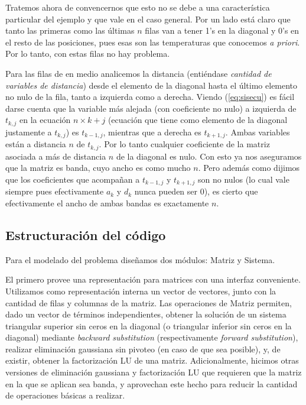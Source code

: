 Tratemos ahora de convencernos que esto no se debe a una característica particular del ejemplo y que vale en el caso general.
Por un lado está claro que tanto las primeras como las últimas $n$ filas van a tener 1's en la diagonal y 0's en el resto de las posiciones, pues esas son las temperaturas que conocemos \textit{a priori}. Por lo tanto, con estas filas no hay problema.

Para las filas de en medio analicemos la distancia (entiéndase \textit{cantidad de variables de distancia}) desde el elemento de la diagonal hasta el último elemento no nulo de la fila, tanto a izquierda como  a derecha. Viendo (\ref{eq:sisecu}) es fácil darse cuenta que la variable más alejada (con coeficiente no nulo) a izquierda de $t_{k,j}$ en la ecuación $n\times k + j$ (ecuación que tiene como elemento de la diagonal justamente a $t_{k,j}$) es $t_{k-1, j}$, mientras que a derecha es $t_{k+1, j}$. Ambas variables están a distancia $n$ de $t_{k,j}$. Por lo tanto cualquier coeficiente de la matriz asociada a más de distancia $n$ de la diagonal es nulo. Con esto ya nos aseguramos que la matriz es banda, cuyo ancho es como mucho $n$. Pero además como dijimos que los coeficientes que acompañan a $t_{k-1, j}$ y $t_{k+1, j}$ son no nulos (lo cual vale siempre pues efectivamente $a_k$ y $d_k$ nunca pueden ser 0), es cierto que efectivamente el ancho de ambas bandas es exactamente $n$. 


\subsection{Estructuración del código}
Para el modelado del problema diseñamos dos módulos: Matriz y Sistema. 

El primero provee una representación para matrices con una interfaz conveniente. Utilizamos como representación interna un vector de vectores, junto con la cantidad de filas y columnas de la matriz. Las operaciones de Matriz permiten, dado un vector de términos independientes, obtener la solución de un sistema triangular superior sin ceros en la diagonal (o triangular inferior sin ceros en la diagonal) mediante \textit{backward substitution} (respectivamente \textit{forward substitution}), realizar eliminación gaussiana sin pivoteo (en caso de que sea posible), y, de existir, obtener la factorización LU de una matriz. Adicionalmente, hicimos otras versiones de eliminación gaussiana y factorización LU que requieren que la matriz en la que se aplican sea banda, y aprovechan este hecho para reducir la cantidad de operaciones básicas a realizar.\\

